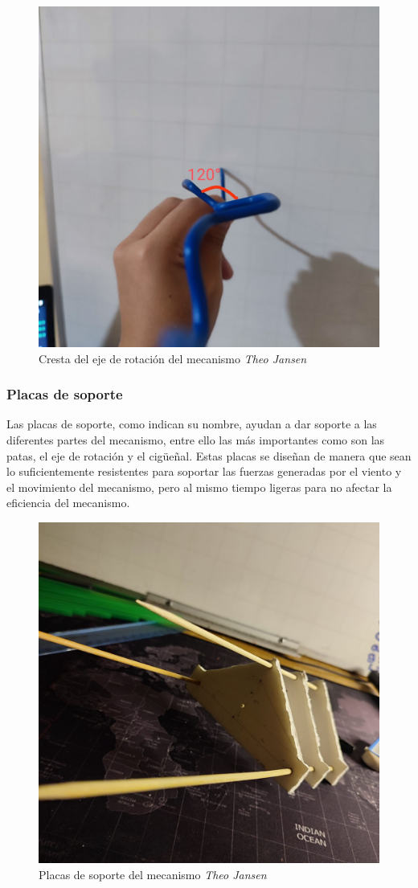 \begin{multicols}{2}
\begin{figure}[H]
  \centering
  \includegraphics[width=0.6\linewidth]{./assets/cresta.jpeg}
  \caption{Cresta del eje de rotación del mecanismo \textit{Theo Jansen}}
  \label{fig:cresta_eje_rotacion}
\end{figure}

\subsubsection{Placas de soporte}
Las placas de soporte, como indican su nombre, ayudan a dar soporte a las diferentes partes del mecanismo, entre ello las más importantes como son las patas, el eje de rotación y el cigüeñal. Estas placas se diseñan de manera que sean lo suficientemente resistentes para soportar las fuerzas generadas por el viento y el movimiento del mecanismo, pero al mismo tiempo ligeras para no afectar la eficiencia del mecanismo.

\begin{figure}[H]
  \centering
  \includegraphics[width=0.6\linewidth]{./assets/placas.jpeg}
  \caption{Placas de soporte del mecanismo \textit{Theo Jansen}}
  \label{fig:placas_soporte}
\end{figure}


\end{multicols}
